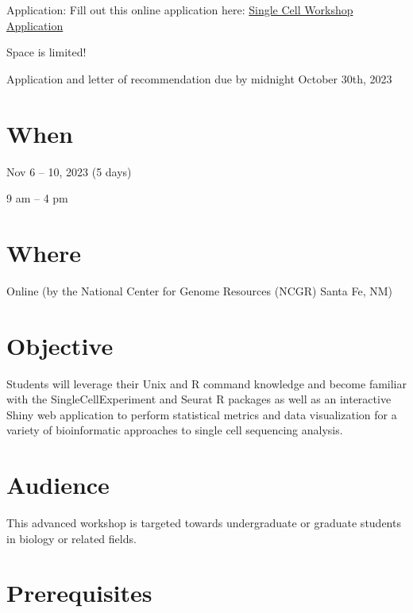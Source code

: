 \documentclass[
]{book}
\begin{document}
Application: Fill out this online application here: \href{https://docs.google.com/forms/d/e/1FAIpQLSfPdh4grpQd94_-kRvZ-NCZbd4RY2W7A31wnqkzwhKTdYZuxg/viewform}{Single Cell Workshop Application}

Space is limited!

Application and letter of recommendation due by midnight October 30th, 2023

\hypertarget{when-2}{%
\section*{When}\label{when-2}}

Nov 6 -- 10, 2023 (5 days)

9 am -- 4 pm

\hypertarget{where-1}{%
\section*{Where}\label{where-1}}

Online (by the National Center for Genome Resources (NCGR) Santa Fe, NM)

\hypertarget{objective-1}{%
\section*{Objective}\label{objective-1}}

Students will leverage their Unix and R command knowledge and become familiar with the SingleCellExperiment and Seurat R packages as well as an interactive Shiny web application to perform statistical metrics and data visualization for a variety of bioinformatic approaches to single cell sequencing analysis.

\hypertarget{audience-1}{%
\section*{Audience}\label{audience-1}}

This advanced workshop is targeted towards undergraduate or graduate students in biology or related fields.

\hypertarget{prerequisites-1}{%
\section*{Prerequisites}\label{prerequisites-1}}
\end{document}
